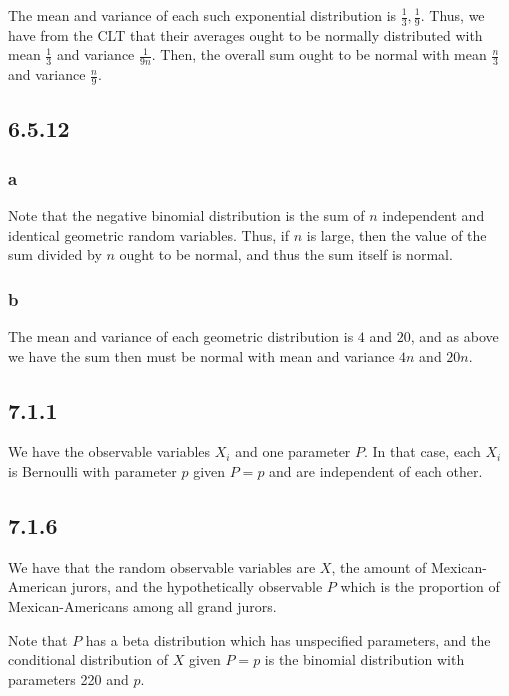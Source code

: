 \documentclass[12pt,letterpaper]{article}
\theoremstyle{definition}
\begin{document}
The mean and variance of each such exponential distribution is $\frac{1}{3},
\frac{1}{9}$. Thus, we have from the CLT that their averages ought to be
normally distributed with mean $\frac{1}{3}$ and variance $\frac{1}{9n}$. Then,
the overall sum ought to be normal with mean $\frac{n}{3}$ and variance $\frac{n}{9}$.

\subsection*{6.5.12}

\subsubsection*{a}

Note that the negative binomial distribution is the sum of $n$ independent and
identical geometric random variables. Thus, if $n$ is large, then the value of
the sum divided by $n$ ought to be normal, and thus the sum itself is normal.

\subsubsection*{b}

The mean and variance of each geometric distribution is $4$ and $20$, and as
above we have the sum then must be normal with mean and variance $4n$ and $20n$.

\subsection*{7.1.1}

We have the observable variables $X_i$ and one parameter $P$. In that case, each
$X_i$ is Bernoulli with parameter $p$ given $P = p$ and are independent of each other.

\subsection*{7.1.6}

We have that the random observable variables are $X$, the amount of
Mexican-American jurors, and the hypothetically observable $P$ which is the
proportion of Mexican-Americans among all grand jurors.

Note that $P$ has a beta distribution which has unspecified parameters, and the
conditional distribution of $X$ given $P= p$ is the binomial distribution with
parameters 220 and $p$.
\end{document}
